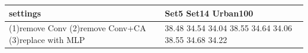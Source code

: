 \begin{tabular}{ll}
\toprule
settings & Set5 Set14 Urban100 \\
\midrule
(1)remove Conv (2)remove Conv+CA (3)replace with MLP & 38.48 34.54 34.04 38.55 34.64 34.06 38.55 34.68 34.22 \\
\bottomrule
\end{tabular}
